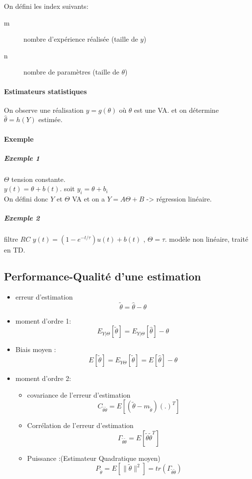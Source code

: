 \documentclass[main.tex]{subfiles}
\begin{document}
On défini les index suivants:
\begin{description}
\item[m] nombre d'expérience réalisée (taille de $y$)
\item[n] nombre de paramètres (taille de $\theta$)
\end{description}
\paragraph{Estimateurs statistiques}
On observe une réalisation $y= g(\theta)$ où $\theta$ est une VA. et on détermine $\hat{\theta} = h(Y)$ estimée.

\paragraph{Exemple}
\subparagraph{Exemple 1}$\Theta$ tension constante.\\
$y(t) = \theta +b(t)$. soit $y_i = \theta + b_i$\\
On défini donc $Y$ et $\Theta$ VA  et on a $Y = A\Theta + B$ -> régression linéaire.
\subparagraph{Exemple 2} filtre $RC$ $y(t) = (1-e^{-t/\tau})u(t)+b(t)$ , $\Theta=\tau$. modèle non linéaire, traité en TD.

\subsection{Performance-Qualité d'une estimation}
\begin{prop}
  \begin{itemize}
  \item erreur d'estimation
    \[
      \tilde{\theta} = \hat{\theta}-\theta
    \]
  \item moment d'ordre 1:
\[
E_{Y|\Theta}[\tilde{\theta}]= E_{Y|\Theta}[\hat{\theta}]-\theta
\]
\item Biais moyen :
  \[
    E[\tilde{\theta}] = E_{Y\Theta}[\tilde{\theta}] = E[\hat{\theta}]-\theta
  \]
\item moment d'ordre 2:
  \begin{itemize}
  \item covariance de l'erreur d'estimation
    \[
      C_{\tilde{\theta}\tilde{\theta}} = E[(\tilde{\theta}-m_{\tilde{\theta}})(.)^T]
    \]
  \item Corrélation de l'erreur d'estimation
    \[
      \Gamma_{\tilde{\theta}\tilde{\theta}} = E[\tilde{\theta}\tilde{\theta}^T]
    \]
  \item Puissance :(Estimateur Quadratique moyen)
    \[
      P_{\tilde{\theta}} = E[\| \tilde{\theta}\|^2] = tr(\Gamma_{\tilde{\theta}\tilde{\theta}})
    \]
  \end{itemize}
  \end{itemize}
\end{prop}
\end{document}
